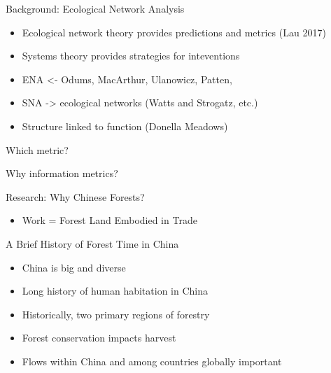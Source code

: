 \documentclass[ignorenonframetext,]{beamer}
\providecommand{\tightlist}{%
  \setlength{\itemsep}{0pt}\setlength{\parskip}{0pt}}
\begin{document}
\begin{frame}{Background: Ecological Network Analysis}

\begin{itemize}
\tightlist
\item
  Ecological network theory provides predictions and metrics (Lau 2017)
\item
  Systems theory provides strategies for inteventions
\item
  ENA \textless{}- Odums, MacArthur, Ulanowicz, Patten,
\item
  SNA -\textgreater{} ecological networks (Watts and Strogatz, etc.)
\item
  Structure linked to function (Donella Meadows)
\end{itemize}

\end{frame}

\begin{frame}{Which metric?}

\end{frame}

\begin{frame}{Why information metrics?}

\end{frame}

\begin{frame}{Research: Why Chinese Forests?}

\begin{itemize}
\tightlist
\item
  Work = Forest Land Embodied in Trade
\end{itemize}

\end{frame}

\begin{frame}{A Brief History of Forest Time in China}

\begin{itemize}
\tightlist
\item
  China is big and diverse
\item
  Long history of human habitation in China
\item
  Historically, two primary regions of forestry
\item
  Forest conservation impacts harvest
\item
  Flows within China and among countries globally important
\end{itemize}

\end{frame}
\end{document}
